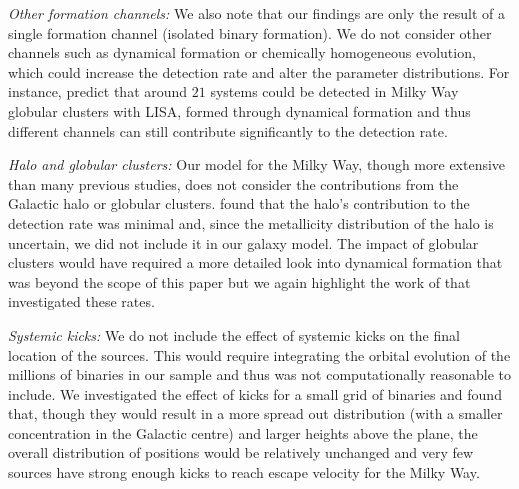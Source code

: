 \textit{Other formation channels:} We also note that our findings are only the result of a single formation channel (isolated binary formation). We do not consider other channels such as dynamical formation or chemically homogeneous evolution, which could increase the detection rate and alter the parameter distributions. For instance, \citet{Kremer+2018} predict that around $21$ systems could be detected in Milky Way globular clusters with LISA, formed through dynamical formation and thus different channels can still contribute significantly to the detection rate.

\textit{Halo and globular clusters:} Our model for the Milky Way, though more extensive than many previous studies, does not consider the contributions from the Galactic halo or globular clusters. \citet{Lamberts+2018} found that the halo's contribution to the detection rate was minimal and, since the metallicity distribution of the halo is uncertain, we did not include it in our galaxy model. The impact of globular clusters would have required a more detailed look into dynamical formation that was beyond the scope of this paper but we again highlight the work of \citet{Kremer+2018} that investigated these rates. 

\textit{Systemic kicks:} We do not include the effect of systemic kicks on the final location of the sources. This would require integrating the orbital evolution of the millions of binaries in our sample and thus was not computationally reasonable to include. We investigated the effect of kicks for a small grid of binaries and found that, though they would result in a more spread out distribution (with a smaller concentration in the Galactic centre) and larger heights above the plane, the overall distribution of positions would be relatively unchanged and very few sources have strong enough kicks to reach escape velocity for the Milky Way.

